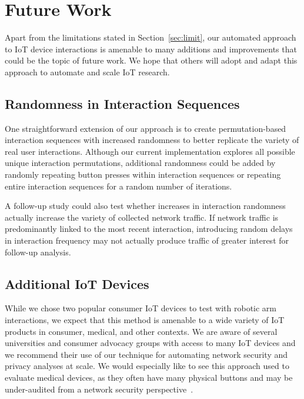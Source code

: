 \section{Future Work}
\label{sec:future}

Apart from the limitations stated in Section~\ref{sec:limit}, our automated approach to IoT device interactions is amenable to many additions and improvements that could be the topic of future work. We hope that others will adopt and adapt this approach to automate and scale IoT research. 

\subsection{Randomness in Interaction Sequences}
One straightforward extension of our approach is to create permutation-based interaction sequences with increased randomness to better replicate the variety of real user interactions. Although our current implementation explores all possible unique interaction permutations, additional randomness could be added by randomly repeating button presses within interaction sequences or repeating entire interaction sequences for a random number of iterations. 


A follow-up study could also test whether increases in interaction randomness actually increase the variety of collected network traffic. If network traffic is predominantly linked to the most recent interaction, introducing random delays in interaction frequency may not actually produce traffic of greater interest for follow-up analysis. 


\subsection{Additional IoT Devices}
While we chose two popular consumer IoT devices to test with robotic arm interactions, we expect that this method is amenable to a wide variety of IoT products in consumer, medical, and other contexts. 
We are aware of several universities and consumer advocacy groups with access to many IoT devices and we recommend their use of our technique for automating network security and privacy analyses at scale. 
We would especially like to see this approach used to evaluate medical devices, as they often have many physical buttons and may be under-audited from a network security perspective~\cite{burns2016brief}. 

